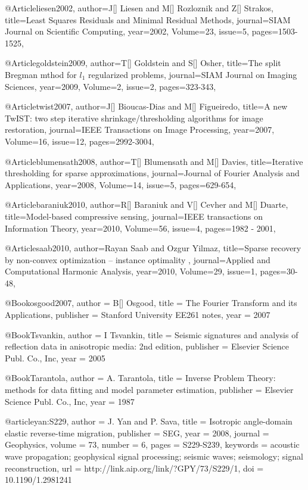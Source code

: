 {@Article{liesen2002,
  author={J[] Liesen and M[] Rozloznik and Z[] Strakos},
  title={Least Squares Residuals and Minimal Residual Methods},
  journal={SIAM Journal on Scientific Computing},
  year=2002,
  Volume=23,
  issue=5,
  pages={1503-1525},
}

@Article{goldstein2009,
  author={T[] Goldstein and S[] Osher},
  title={The split Bregman mthod for $l_1$ regularized problems},
  journal={SIAM Journal on Imaging Sciences},
  year=2009,
  Volume=2,
  issue=2,
  pages={323-343},
}



@Article{twist2007,
  author={J[] Bioucas-Dias and M[] Figueiredo},
  title={A new TwIST: two step iterative shrinkage/thresholding algorithms for image restoration},
  journal={IEEE Transactions on Image Processing},
  year=2007,
  Volume=16,
  issue=12,
  pages={2992-3004},
}

@Article{blumensath2008,
  author={T[] Blumensath and M[] Davies},
  title={Iterative thresholding for sparse approximations},
  journal={Journal of Fourier Analysis and Applications},
  year=2008,
  Volume=14,
  issue=5,
  pages={629-654},
}

@Article{baraniuk2010,
  author={R[] Baraniuk and V[] Cevher and M[] Duarte},
  title={Model-based compressive sensing},
  journal={IEEE transactions on Information Theory},
  year=2010,
  Volume=56,
  issue=4,
  pages={1982 - 2001},
}

@Article{saab2010,
  author={Rayan Saab and Ozgur Yilmaz},
  title={Sparse recovery by non-convex optimization – instance optimality },
  journal={Applied and Computational Harmonic Analysis},
  year=2010,
  Volume=29,
  issue=1,
  pages={30-48},
}

@Book{osgood2007,
  author =	 {B[] Osgood},
  title =	 {The Fourier Transform and its Applications},
  publisher =	 {Stanford University EE261 notes},
  year =	 2007
}

@Book{Tsvankin,
  author =	 {I Tsvankin},
  title =	 {Seismic signatures and analysis of reflection data
                  in anisotropic media: 2nd edition},
  publisher =	 {Elsevier Science Publ. Co., Inc},
  year =	 2005
}

@Book{Tarantola,
  author = 	 {A. Tarantola},
  title = 	 {Inverse {P}roblem {T}heory: methods for data
                 fitting and model parameter estimation},
  publisher = 	 {Elsevier Science Publ. Co., Inc},
  year = 	 1987
}

@article{yan:S229,
  author =	 {J. Yan and P. Sava},
  title =	 {Isotropic angle-domain elastic reverse-time
                  migration},
  publisher =	 {SEG},
  year =	 2008,
  journal =	 {Geophysics},
  volume =	 73,
  number =	 6,
  pages =	 {S229-S239},
  keywords =	 {acoustic wave propagation; geophysical signal
                  processing; seismic waves; seismology; signal
                  reconstruction},
  url =		 {http://link.aip.org/link/?GPY/73/S229/1},
  doi =		 {10.1190/1.2981241}
}

}
